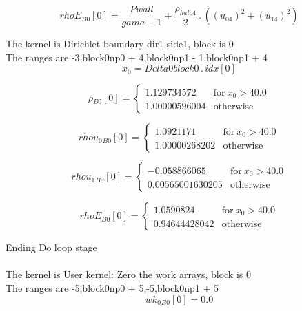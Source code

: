 \documentclass{article}
\begin{document}
\begin{dmath}{rhoE{_{B0}}}[{0}] = \frac{Pwall}{gama - 1} + \frac{\rho_{halo 4}}{2} \,.\, \left(\left(u_{04} \right)^{2} + \left(u_{14} \right)^{2}\right)\end{dmath}

\noindent The kernel is Dirichlet boundary dir1 side1, block is 0\\\noindent The ranges are -3,block0np0 + 4,block0np1 - 1,block0np1 + 4\\\begin{dmath}x_{0} = Delta0block0 \,.\, {idx}[{0}]\end{dmath}

\begin{dmath}{\rho{_{B0}}}[{0}] = \begin{cases} 1.129734572 & \text{for}\: x_{0} > 40.0 \\1.00000596004 & \text{otherwise} \end{cases}\end{dmath}

\begin{dmath}{rhou_{0}{_{B0}}}[{0}] = \begin{cases} 1.0921171 & \text{for}\: x_{0} > 40.0 \\1.00000268202 & \text{otherwise} \end{cases}\end{dmath}

\begin{dmath}{rhou_{1}{_{B0}}}[{0}] = \begin{cases} -0.058866065 & \text{for}\: x_{0} > 40.0 \\0.00565001630205 & \text{otherwise} \end{cases}\end{dmath}

\begin{dmath}{rhoE{_{B0}}}[{0}] = \begin{cases} 1.0590824 & \text{for}\: x_{0} > 40.0 \\0.94644428042 & \text{otherwise} \end{cases}\end{dmath}

\noindent Ending Do loop stage\\
\\\noindent The kernel is User kernel: Zero the work arrays, block is 0\\\noindent The ranges are -5,block0np0 + 5,-5,block0np1 + 5\\\begin{dmath}{wk_{0}{_{B0}}}[{0}] = 0.0\end{dmath}
\end{document}

